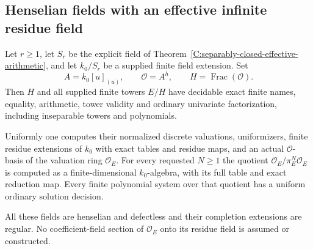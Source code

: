 \subsection{Henselian fields with an effective infinite residue field}
\label{C:infinite-residue-henselian-subsection}

\begin{theorem}
\label{C:infinite-residue-henselian-arithmetic}
Let $r\ge1$, let $S_r$ be the explicit field of
Theorem~\ref{C:separably-closed-effective-arithmetic},
and let $k_0/S_r$ be a supplied finite field
extension.  Set
\[
 A=k_0[u]_{(u)},\qquad
 \mathcal O=A^h,\qquad H=\operatorname{Frac}(\mathcal O).
                                                               \tag{C.3.IR1}
\]
Then $H$ and all supplied finite towers $E/H$
have decidable exact finite names, equality,
arithmetic, tower validity and ordinary
univariate factorization, including inseparable
towers and polynomials.

Uniformly one computes their normalized
discrete valuations, uniformizers, finite
residue extensions of $k_0$ with exact
tables and residue maps, and an actual
$\mathcal O$-basis of the valuation ring
$\mathcal O_E$.
For every requested $N\ge1$ the quotient
$\mathcal O_E/\pi_E^N\mathcal O_E$ is
computed as a finite-dimensional
$k_0$-algebra, with its full table and
exact reduction map.
Every finite polynomial system over
that quotient has a uniform ordinary
solution decision.

All these fields are henselian and
defectless and their completion extensions
are regular.  No coefficient-field
section of $\mathcal O_E$ onto its
residue field is assumed or constructed.
\end{theorem}
